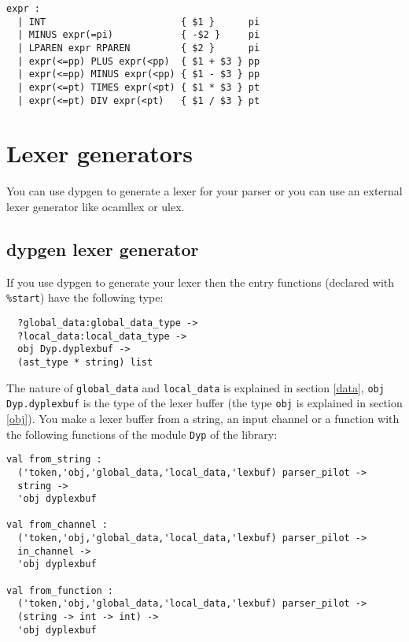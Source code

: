 \documentclass[12pt]{article}
\begin{document}
{\begin{verbatim}
expr :
  | INT                        { $1 }      pi
  | MINUS expr(=pi)            { -$2 }     pi
  | LPAREN expr RPAREN         { $2 }      pi
  | expr(<=pp) PLUS expr(<pp)  { $1 + $3 } pp
  | expr(<=pp) MINUS expr(<pp) { $1 - $3 } pp
  | expr(<=pt) TIMES expr(<pt) { $1 * $3 } pt
  | expr(<=pt) DIV expr(<pt)   { $1 / $3 } pt
\end{verbatim}

\section{Lexer generators}

You can use dypgen to generate a lexer for your parser or you can use an external lexer generator like ocamllex or ulex.

\subsection {dypgen lexer generator}\label{dyplex}

If you use dypgen to generate your lexer then the entry functions (declared with \verb|%start|) have the following type:
\begin{verbatim}
  ?global_data:global_data_type ->
  ?local_data:local_data_type ->
  obj Dyp.dyplexbuf ->
  (ast_type * string) list
\end{verbatim}

The nature of \verb|global_data| and \verb|local_data| is explained in section \ref{data}, \verb|obj Dyp.dyplexbuf| is the type of the lexer buffer (the type \verb|obj| is explained in section \ref{obj}). You make a lexer buffer from a string, an input channel or a function with the following functions of the module \verb|Dyp| of the library:
\begin{verbatim}
val from_string :
  ('token,'obj,'global_data,'local_data,'lexbuf) parser_pilot ->
  string ->
  'obj dyplexbuf

val from_channel :
  ('token,'obj,'global_data,'local_data,'lexbuf) parser_pilot ->
  in_channel ->
  'obj dyplexbuf

val from_function :
  ('token,'obj,'global_data,'local_data,'lexbuf) parser_pilot ->
  (string -> int -> int) ->
  'obj dyplexbuf
\end{verbatim}

}
\end{document}
